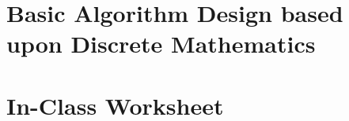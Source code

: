 \documentclass[12pt,twoside,openright]{book}
\theoremstyle{definition}
\begin{document}
	\part{Basic Algorithm Design based upon Discrete Mathematics}
	
	\part{In-Class Worksheet}
%	
%	
	
	
	\backmatter
%	
	\printindex
\end{document}
